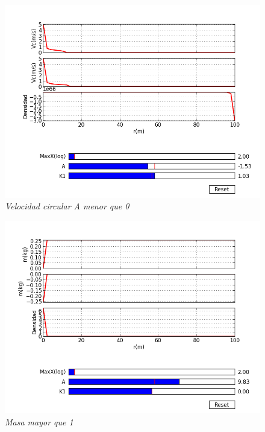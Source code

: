 \documentclass[12pt]{book}
\begin{document}
\begin{figure}[!h]
 \centering
 \includegraphics[scale=0.7]{velocity3.png}
 \caption{\emph{Velocidad circular A menor que 0}}
 \label{Fig: 1}
\end{figure}



\begin{figure}[!h]
 \centering
 \includegraphics[scale=0.7]{masa4.png}
 \caption{\emph{Masa mayor que 1 }}
 \label{Fig: 1}
\end{figure}
\end{document}
